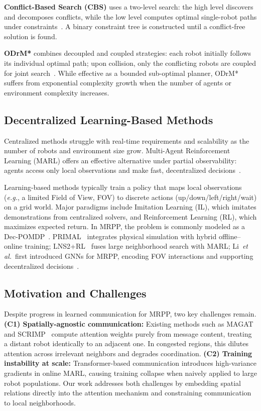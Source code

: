 \documentclass[conference]{IEEEtran}
\newcommand{\eg}{\textit{e.g.}}
\newcommand{\etal}{\textit{et al.}}
\begin{document}
\textbf{Conflict-Based Search (CBS)} uses a two-level search:
the high level discovers and decomposes conflicts, while the low
level computes optimal single-robot paths under
constraints~\cite{sharon2015cbs}.
A binary constraint tree is constructed until a conflict-free
solution is found.

\textbf{ODrM*} combines decoupled and coupled strategies: each
robot initially follows its individual optimal path; upon
collision, only the conflicting robots are coupled for joint
search~\cite{ren2021subdimensional,ellis2021mapf}.
While effective as a bounded sub-optimal planner, ODrM* suffers
from exponential complexity growth when the number of agents or
environment complexity increases.

\subsection{Decentralized Learning-Based Methods}

Centralized methods struggle with real-time requirements and
scalability as the number of robots and environment size grow.
Multi-Agent Reinforcement Learning (MARL) offers an effective
alternative under partial observability: agents access only
local observations and make fast, decentralized
decisions~\cite{huang2021strategic}.

Learning-based methods typically train a policy that maps local
observations (\eg, a limited Field of View, FOV) to discrete
actions (up/down/left/right/wait) on a grid world.
Major paradigms include Imitation Learning (IL), which imitates
demonstrations from centralized solvers, and Reinforcement
Learning (RL), which maximizes expected return.
In MRPP, the problem is commonly modeled as a
Dec-POMDP~\cite{huang2021strategic}.
PRIMAL~\cite{sartoretti2019primal} integrates physical simulation
with hybrid offline--online training;
LNS2+RL~\cite{wang2025lns2rl} fuses large neighborhood search
with MARL;
Li~\etal~first introduced GNNs for MRPP, encoding FOV
interactions and supporting decentralized
decisions~\cite{li2020gnn,li2021magat}.

\subsection{Motivation and Challenges}

Despite progress in learned communication for MRPP, two key
challenges remain.
\textbf{(C1) Spatially-agnostic communication:}
Existing methods such as MAGAT~\cite{li2021magat} and
SCRIMP~\cite{wang2023scrimp} compute attention weights purely from
message content, treating a distant robot identically to an
adjacent one. In congested regions, this dilutes attention across
irrelevant neighbors and degrades coordination.
\textbf{(C2) Training instability at scale:}
Transformer-based communication introduces high-variance gradients
in online MARL, causing training collapse when naively applied to
large robot populations.
Our work addresses both challenges by embedding spatial relations
directly into the attention mechanism and constraining
communication to local neighborhoods.
\end{document}
